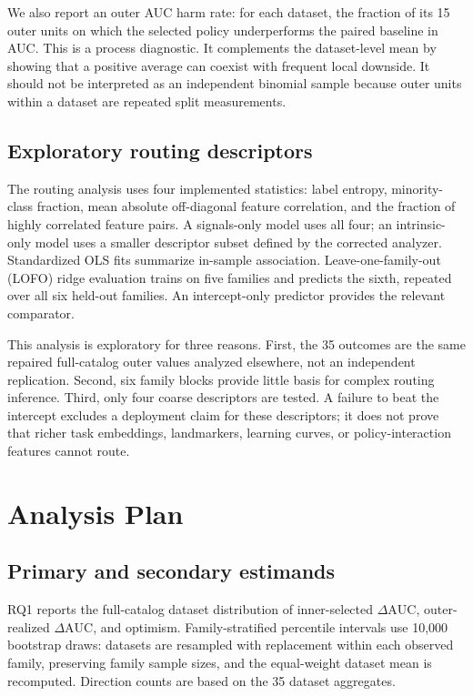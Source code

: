 \documentclass[referee]{USG}
\newcommand{\dauc}{\ensuremath{\Delta\mathrm{AUC}}}
\begin{document}
We also report an outer AUC harm rate: for each dataset, the fraction of its 15 outer units on which the selected policy underperforms the paired baseline in AUC. This is a process diagnostic. It complements the dataset-level mean by showing that a positive average can coexist with frequent local downside. It should not be interpreted as an independent binomial sample because outer units within a dataset are repeated split measurements.

\subsection{Exploratory routing descriptors}
The routing analysis uses four implemented statistics: label entropy, minority-class fraction, mean absolute off-diagonal feature correlation, and the fraction of highly correlated feature pairs. A signals-only model uses all four; an intrinsic-only model uses a smaller descriptor subset defined by the corrected analyzer. Standardized OLS fits summarize in-sample association. Leave-one-family-out (LOFO) ridge evaluation trains on five families and predicts the sixth, repeated over all six held-out families. An intercept-only predictor provides the relevant comparator.

This analysis is exploratory for three reasons. First, the 35 outcomes are the same repaired full-catalog outer values analyzed elsewhere, not an independent replication. Second, six family blocks provide little basis for complex routing inference. Third, only four coarse descriptors are tested. A failure to beat the intercept excludes a deployment claim for these descriptors; it does not prove that richer task embeddings, landmarkers, learning curves, or policy-interaction features cannot route.

\section{Analysis Plan}
\subsection{Primary and secondary estimands}
RQ1 reports the full-catalog dataset distribution of inner-selected \dauc, outer-realized \dauc, and optimism. Family-stratified percentile intervals use 10,000 bootstrap draws: datasets are resampled with replacement within each observed family, preserving family sample sizes, and the equal-weight dataset mean is recomputed. Direction counts are based on the 35 dataset aggregates.
\end{document}
